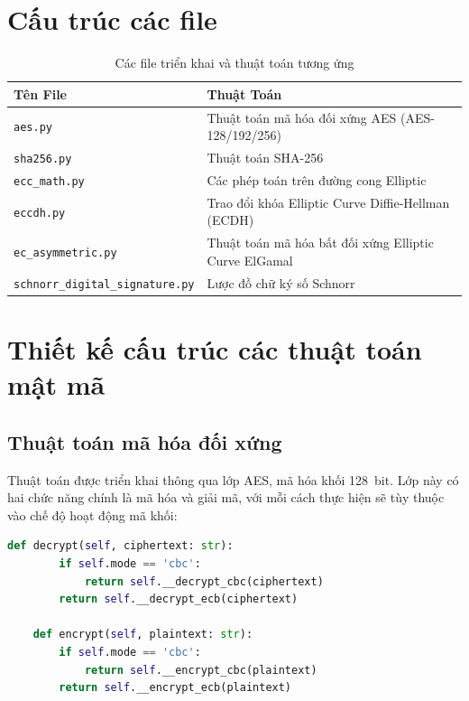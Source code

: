\section{Cấu trúc các file}
\begin{table}[H]
	\centering
	\caption{Các file triển khai và thuật toán tương ứng}
	\label{tab:algorithms}
	\begin{tabular}{|l|l|}
		\hline
		\textbf{Tên File} & \textbf{Thuật Toán} \\
		\hline
		\texttt{aes.py} & Thuật toán mã hóa đối xứng AES (AES-128/192/256) \\
		\hline
		\texttt{sha256.py} & Thuật toán SHA-256 \\
		\hline
		\texttt{ecc\_math.py} & Các phép toán trên đường cong Elliptic \\
		\hline
		\texttt{eccdh.py} & Trao đổi khóa Elliptic Curve Diffie-Hellman (ECDH) \\
		\hline
		\texttt{ec\_asymmetric.py} & Thuật toán mã hóa bất đối xứng Elliptic Curve ElGamal  \\
		\hline
		\texttt{schnorr\_digital\_signature.py} & Lược đồ chữ ký số Schnorr \\
		\hline
	\end{tabular}
\end{table}

\section{Thiết kế cấu trúc các thuật toán mật mã}

\subsection{Thuật toán mã hóa đối xứng}

Thuật toán được triển khai thông qua lớp AES, mã hóa khối 128~bit. Lớp này có hai chức năng chính là mã hóa và giải mã, với mỗi cách thực hiện sẽ tùy thuộc vào chế độ hoạt động mã khối:

\begin{lstlisting}[language=Python]
	def decrypt(self, ciphertext: str):
		if self.mode == 'cbc':
			return self.__decrypt_cbc(ciphertext)
		return self.__decrypt_ecb(ciphertext)
	
	def encrypt(self, plaintext: str):
		if self.mode == 'cbc':
			return self.__encrypt_cbc(plaintext)
		return self.__encrypt_ecb(plaintext)
	
\end{lstlisting}

